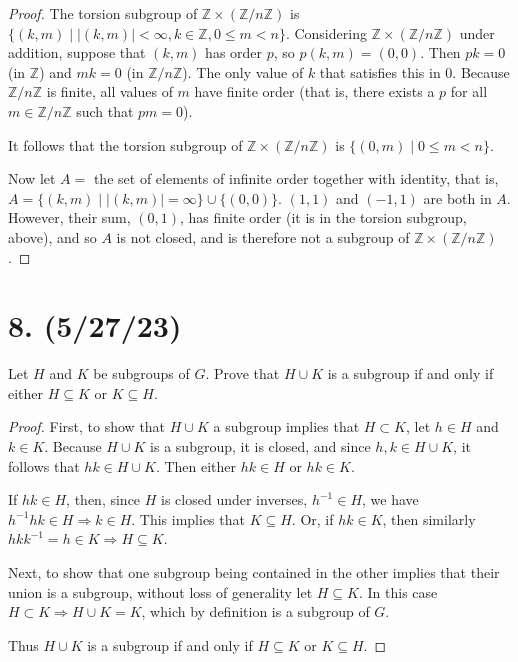\documentclass{article}
\begin{document}
\begin{proof}
    The torsion subgroup of $\mathbb{Z} \times (\mathbb{Z}/n\mathbb{Z})$ is $\{ (k, m) \mid |(k, m)| < \infty, k \in \mathbb{Z}, 0 \leq m < n \}$. Considering $\mathbb{Z} \times (\mathbb{Z}/n\mathbb{Z})$ under addition, suppose that $(k, m)$ has order $p$, so $p(k, m) = (0, 0)$. Then $pk = 0$ (in $\mathbb{Z}$) and $mk = 0$ (in $\mathbb{Z}/n\mathbb{Z}$). The only value of $k$ that satisfies this in 0. Because $\mathbb{Z}/n\mathbb{Z}$ is finite, all values of $m$ have finite order (that is, there exists a $p$ for all $m \in \mathbb{Z}/n\mathbb{Z}$ such that $pm = 0$).

    It follows that the torsion subgroup of $\mathbb{Z} \times (\mathbb{Z}/n\mathbb{Z})$ is $\{ (0, m) \mid 0 \leq m < n \}$.

    Now let $A = $ the set of elements of infinite order together with identity, that is, $A = \{ (k, m) \mid |(k, m)| = \infty \} \cup \{ (0, 0) \}$. $(1, 1)$ and $(-1, 1)$ are both in $A$. However, their sum, $(0, 1)$, has finite order (it is in the torsion subgroup, above), and so $A$ is not closed, and is therefore not a subgroup of $\mathbb{Z} \times (\mathbb{Z}/n\mathbb{Z})$.
\end{proof}

\section*{8. (5/27/23)}

Let $H$ and $K$ be subgroups of $G$. Prove that $H \cup K$ is a subgroup if and only if either $H \subseteq K$ or $K \subseteq H$.

\begin{proof}
    First, to show that $H \cup K$ a subgroup implies that $H \subset K$, let $h \in H$ and $k \in K$. Because $H \cup K$ is a subgroup, it is closed, and since $h, k \in H \cup K$, it follows that $hk \in H \cup K$. Then either $hk \in H$ or $hk \in K$.
    
    If $hk \in H$, then, since $H$ is closed under inverses, $h^{-1} \in H$, we have $h^{-1}hk \in H \Rightarrow k \in H$. This implies that $K \subseteq H$. Or, if $hk \in K$, then similarly $hkk^{-1} = h \in K \Rightarrow H \subseteq K$.

    Next, to show that one subgroup being contained in the other implies that their union is a subgroup, without loss of generality let $H \subseteq K$. In this case $H \subset K \Rightarrow H \cup K = K$, which by definition is a subgroup of $G$.

    Thus $H \cup K$ is a subgroup if and only if $H \subseteq K$ or $K \subseteq H$.
\end{proof}\
\end{document}
